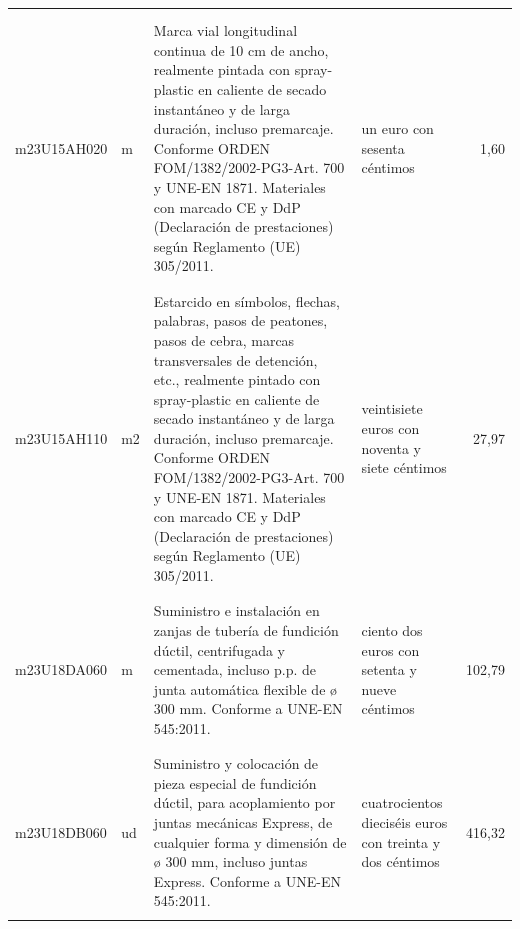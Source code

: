 \documentclass{book}%
\begin{document}
\begin{supertabular}{|l|l|p{5cm}|p{3cm}|r|}
&&&&\\%
&&&&\\%
m23U15AH020&m&Marca vial longitudinal continua de 10 cm de ancho, realmente pintada con spray{-}plastic en caliente de secado instantáneo y de larga duración, incluso premarcaje. Conforme ORDEN FOM/1382/2002{-}PG3{-}Art. 700 y UNE{-}EN 1871. Materiales con marcado CE y DdP (Declaración de prestaciones) según Reglamento (UE) 305/2011.&un euro con sesenta céntimos&1,60\\%
&&&&\\%
&&&&\\%
m23U15AH110&m2&Estarcido en símbolos, flechas, palabras, pasos de peatones, pasos de cebra, marcas transversales de detención, etc., realmente pintado con spray{-}plastic en caliente de secado instantáneo y de larga duración, incluso premarcaje. Conforme ORDEN FOM/1382/2002{-}PG3{-}Art. 700 y UNE{-}EN 1871. Materiales con marcado CE y DdP (Declaración de prestaciones) según Reglamento (UE) 305/2011.&veintisiete euros con noventa y siete céntimos&27,97\\%
&&&&\\%
&&&&\\%
m23U18DA060&m&Suministro e instalación en zanjas de tubería de fundición dúctil, centrifugada y cementada, incluso p.p. de junta automática flexible de ø 300 mm. Conforme a UNE{-}EN 545:2011.&ciento dos euros con setenta y nueve céntimos&102,79\\%
&&&&\\%
&&&&\\%
m23U18DB060&ud&Suministro y colocación de pieza especial de fundición dúctil, para acoplamiento por juntas mecánicas Express, de cualquier forma y dimensión de ø 300 mm, incluso juntas Express. Conforme a UNE{-}EN 545:2011.&cuatrocientos dieciséis euros con treinta y dos céntimos&416,32\\%
&&&&\\%
\end{supertabular}%
\normalsize%


%
\end{document}
